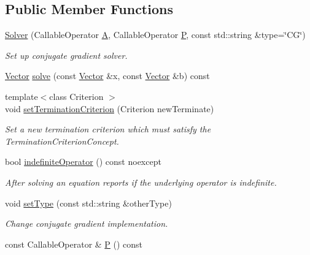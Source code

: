 \subsection*{\-Public \-Member \-Functions}
\begin{DoxyCompactItemize}
\item 
\hyperlink{classSpacy_1_1CG_1_1Solver_a4b6e80b42da6ee9a64cbd07f85964cd5}{\-Solver} (\-Callable\-Operator \hyperlink{classSpacy_1_1CG_1_1Solver_a9b0fa76350c42fb60b2fbeb40b343fa2}{\-A}, \-Callable\-Operator \hyperlink{classSpacy_1_1CG_1_1Solver_a929d2b9deecfd96ef7efb8097e567f37}{\-P}, const std\-::string \&type=\char`\"{}\-C\-G\char`\"{})
\begin{DoxyCompactList}\small\item\em \-Set up conjugate gradient solver. \end{DoxyCompactList}\item 
\hyperlink{classSpacy_1_1Vector}{\-Vector} \hyperlink{classSpacy_1_1CG_1_1Solver_a23770606bb41f2d8f5a6ae71d07934ab}{solve} (const \hyperlink{classSpacy_1_1Vector}{\-Vector} \&x, const \hyperlink{classSpacy_1_1Vector}{\-Vector} \&b) const 
\item 
{\footnotesize template$<$class Criterion $>$ }\\void \hyperlink{classSpacy_1_1CG_1_1Solver_a7fe2345e859b267c86acff9f3920db3b}{set\-Termination\-Criterion} (\-Criterion new\-Terminate)
\begin{DoxyCompactList}\small\item\em \-Set a new termination criterion which must satisfy the \-Termination\-Criterion\-Concept. \end{DoxyCompactList}\item 
bool \hyperlink{classSpacy_1_1CG_1_1Solver_ae0b6c7b754e093610df6d67bf3067acf}{indefinite\-Operator} () const noexcept
\begin{DoxyCompactList}\small\item\em \-After solving an equation reports if the underlying operator is indefinite. \end{DoxyCompactList}\item 
void \hyperlink{classSpacy_1_1CG_1_1Solver_a4009b5e2062e4930f0cfdc9d979c7b80}{set\-Type} (const std\-::string \&other\-Type)
\begin{DoxyCompactList}\small\item\em \-Change conjugate gradient implementation. \end{DoxyCompactList}\item 
const \-Callable\-Operator \& \hyperlink{classSpacy_1_1CG_1_1Solver_a929d2b9deecfd96ef7efb8097e567f37}{\-P} () const 

\end{DoxyCompactItemize}
